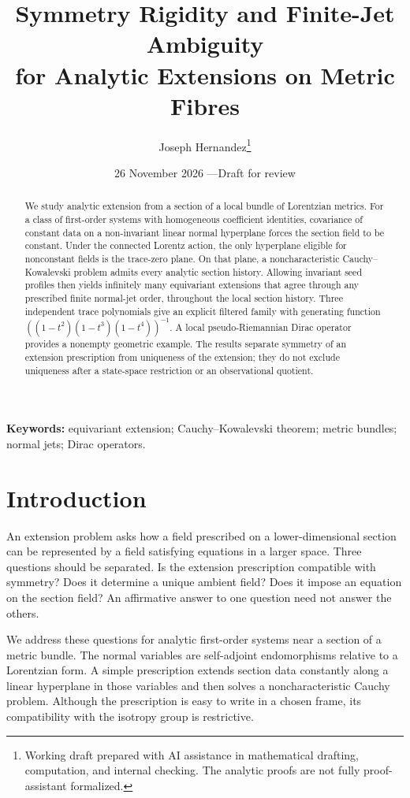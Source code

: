 \documentclass[11pt]{article}
\title{Symmetry Rigidity and Finite-Jet Ambiguity\\for Analytic Extensions on Metric Fibres}
\author{Joseph Hernandez\thanks{Working draft prepared with AI assistance in mathematical drafting, computation, and internal checking. The analytic proofs are not fully proof-assistant formalized.}}
\date{26 November 2026 \quad\textnormal{---}\quad Draft for review}
\theoremstyle{definition}\newtheorem{definition}[theorem]{Definition}
\theoremstyle{remark}\newtheorem{remark}[theorem]{Remark}
\begin{document}
\maketitle
\begin{abstract}
We study analytic extension from a section of a local bundle of Lorentzian metrics. For a class of first-order systems with homogeneous coefficient identities, covariance of constant data on a non-invariant linear normal hyperplane forces the section field to be constant. Under the connected Lorentz action, the only hyperplane eligible for nonconstant fields is the trace-zero plane. On that plane, a noncharacteristic Cauchy--Kowalevski problem admits every analytic section history. Allowing invariant seed profiles then yields infinitely many equivariant extensions that agree through any prescribed finite normal-jet order, throughout the local section history. Three independent trace polynomials give an explicit filtered family with generating function $((1-t^2)(1-t^3)(1-t^4))^{-1}$. A local pseudo-Riemannian Dirac operator provides a nonempty geometric example. The results separate symmetry of an extension prescription from uniqueness of the extension; they do not exclude uniqueness after a state-space restriction or an observational quotient.
\end{abstract}
\noindent\textbf{Keywords:} equivariant extension; Cauchy--Kowalevski theorem; metric bundles; normal jets; Dirac operators.

\section{Introduction}
An extension problem asks how a field prescribed on a lower-dimensional section can be represented by a field satisfying equations in a larger space. Three questions should be separated. Is the extension prescription compatible with symmetry? Does it determine a unique ambient field? Does it impose an equation on the section field? An affirmative answer to one question need not answer the others.

We address these questions for analytic first-order systems near a section of a metric bundle. The normal variables are self-adjoint endomorphisms relative to a Lorentzian form. A simple prescription extends section data constantly along a linear hyperplane in those variables and then solves a noncharacteristic Cauchy problem. Although the prescription is easy to write in a chosen frame, its compatibility with the isotropy group is restrictive.
\end{document}
